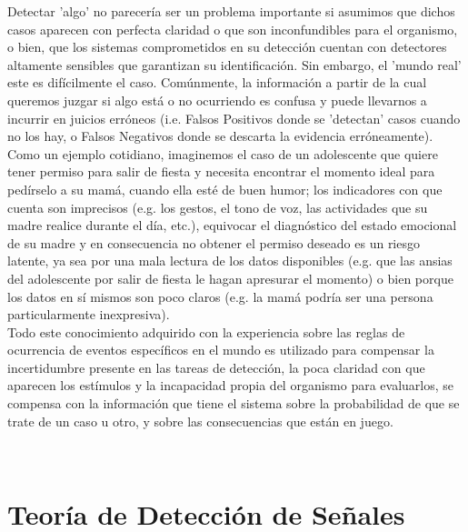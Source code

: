  Detectar 'algo' no parecería ser un problema importante si asumimos que dichos casos aparecen con perfecta claridad o que son inconfundibles para el organismo, o bien, que los sistemas comprometidos en su detección cuentan con detectores altamente sensibles que garantizan su identificación. Sin embargo, el 'mundo real' este es difícilmente el caso. Comúnmente, la información a partir de la cual queremos juzgar si algo está o no ocurriendo es confusa y puede llevarnos a incurrir en juicios erróneos (i.e. Falsos Positivos donde se 'detectan' casos cuando no los hay, o Falsos Negativos donde se descarta la evidencia erróneamente). Como un ejemplo cotidiano, imaginemos el caso de un adolescente que quiere tener permiso para salir de fiesta y necesita encontrar el momento ideal para pedírselo a su mamá, cuando ella esté de buen humor; los indicadores con que cuenta son imprecisos (e.g. los gestos, el tono de voz, las actividades que su madre realice durante el día, etc.), equivocar el diagnóstico del estado emocional de su madre y en consecuencia no obtener el permiso deseado es un riesgo latente, ya sea por una mala lectura de los datos disponibles (e.g. que las ansias del adolescente por salir de fiesta le hagan apresurar el momento) o bien porque los datos en sí mismos son poco claros (e.g. la mamá podría ser una persona particularmente inexpresiva).\\ 


 Todo este conocimiento adquirido con la experiencia sobre las reglas de ocurrencia de eventos específicos en el mundo es utilizado para compensar la incertidumbre presente en las tareas de detección, la poca claridad con que aparecen los estímulos y la incapacidad propia del organismo para evaluarlos, se compensa con la información que tiene el sistema sobre la probabilidad de que se trate de un caso u otro, y sobre las consecuencias que están en juego.

\\ 

\section{Teoría de Detección de Señales}


